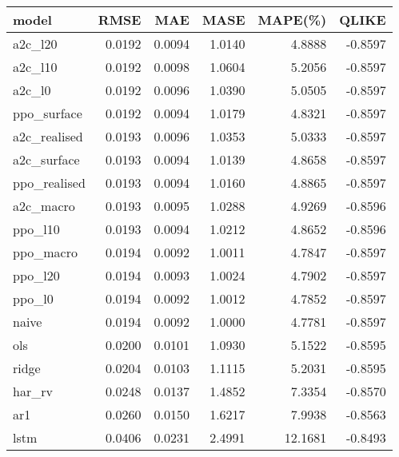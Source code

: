 \begin{tabular}{lrrrrr}
\hline
model & RMSE & MAE & MASE & MAPE(\%) & QLIKE \\
\hline
a2c\_l20 & 0.0192 & 0.0094 & 1.0140 & 4.8888 & -0.8597 \\
a2c\_l10 & 0.0192 & 0.0098 & 1.0604 & 5.2056 & -0.8597 \\
a2c\_l0 & 0.0192 & 0.0096 & 1.0390 & 5.0505 & -0.8597 \\
ppo\_surface & 0.0192 & 0.0094 & 1.0179 & 4.8321 & -0.8597 \\
a2c\_realised & 0.0193 & 0.0096 & 1.0353 & 5.0333 & -0.8597 \\
a2c\_surface & 0.0193 & 0.0094 & 1.0139 & 4.8658 & -0.8597 \\
ppo\_realised & 0.0193 & 0.0094 & 1.0160 & 4.8865 & -0.8597 \\
a2c\_macro & 0.0193 & 0.0095 & 1.0288 & 4.9269 & -0.8596 \\
ppo\_l10 & 0.0193 & 0.0094 & 1.0212 & 4.8652 & -0.8596 \\
ppo\_macro & 0.0194 & 0.0092 & 1.0011 & 4.7847 & -0.8597 \\
ppo\_l20 & 0.0194 & 0.0093 & 1.0024 & 4.7902 & -0.8597 \\
ppo\_l0 & 0.0194 & 0.0092 & 1.0012 & 4.7852 & -0.8597 \\
naive & 0.0194 & 0.0092 & 1.0000 & 4.7781 & -0.8597 \\
ols & 0.0200 & 0.0101 & 1.0930 & 5.1522 & -0.8595 \\
ridge & 0.0204 & 0.0103 & 1.1115 & 5.2031 & -0.8595 \\
har\_rv & 0.0248 & 0.0137 & 1.4852 & 7.3354 & -0.8570 \\
ar1 & 0.0260 & 0.0150 & 1.6217 & 7.9938 & -0.8563 \\
lstm & 0.0406 & 0.0231 & 2.4991 & 12.1681 & -0.8493 \\
\hline
\end{tabular}
